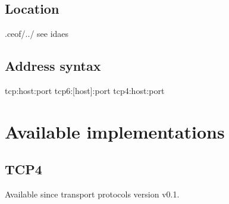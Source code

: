 \documentclass[12pt,a4paper]{article}
\begin{document}
\subsection{Location}
.ceof/../ see idaes
\subsection{Address syntax}
tcp:host:port
tcp6:[host]:port
tcp4:host:port
\section{Available implementations}
\subsection{TCP4}
Available since transport protocols version v0.1.

\end{document}
